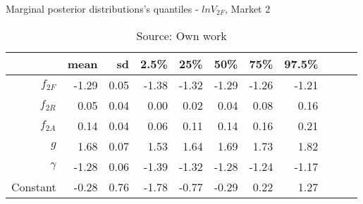 \begin{table}[H]
\caption{Marginal posterior distributions's quantiles - $ln V_{2F}$,  Market 2}
\centering
\begin{tabular}{rrrrrrrrrrr}
  \toprule
            & mean   & sd   & 2.5\% & 25\%  & 50\%  & 75\%  & 97.5\% \\ 
  \hline

  $f_{2F}$  & -1.29  & 0.05 & -1.38 & -1.32 & -1.29 & -1.26 & -1.21 \\ 
  $f_{2R}$  & 0.05   & 0.04 & 0.00  & 0.02  & 0.04  & 0.08  & 0.16  \\ 
  $f_{2A}$  & 0.14   & 0.04 & 0.06  & 0.11  & 0.14  & 0.16  & 0.21  \\ 
  $g$       & 1.68   & 0.07 & 1.53  & 1.64  & 1.69  & 1.73  & 1.82  \\ 
  $\gamma$  & -1.28  & 0.06 & -1.39 & -1.32 & -1.28 & -1.24 & -1.17 \\ 
  Constant  & -0.28  & 0.76 & -1.78 & -0.77 & -0.29 & 0.22  & 1.27  \\ 
     \bottomrule
\end{tabular}
\caption*{Source: Own work}
\end{table}
